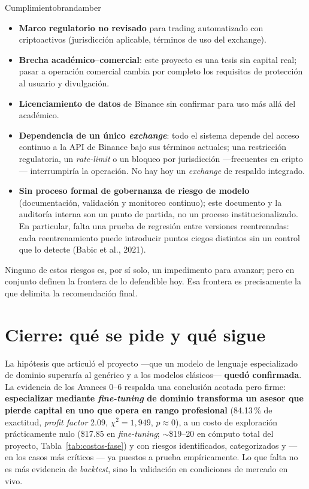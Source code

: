 \documentclass[11pt]{article}
\begin{document}
\begin{minipage}{0.485\linewidth}
\begin{riskpanel}{Cumplimiento}{brandamber}
\begin{itemize}
\item \textbf{Marco regulatorio no revisado} para trading automatizado con criptoactivos (jurisdicci\'on aplicable, t\'erminos de uso del exchange).
\item \textbf{Brecha acad\'emico--comercial}: este proyecto es una tesis sin capital real; pasar a operaci\'on comercial cambia por completo los requisitos de protecci\'on al usuario y divulgaci\'on.
\item \textbf{Licenciamiento de datos} de Binance sin confirmar para uso m\'as all\'a del acad\'emico.
\item \textbf{Dependencia de un \'unico \textit{exchange}}: todo el sistema depende del acceso continuo a la API de Binance bajo sus t\'erminos actuales; una restricci\'on regulatoria, un \textit{rate-limit} o un bloqueo por jurisdicci\'on ---frecuentes en cripto--- interrumpir\'ia la operaci\'on. No hay hoy un \textit{exchange} de respaldo integrado.
\item \textbf{Sin proceso formal de gobernanza de riesgo de modelo} (documentaci\'on, validaci\'on y monitoreo continuo); este documento y la auditor\'ia interna son un punto de partida, no un proceso institucionalizado. En particular, falta una prueba de regresi\'on entre versiones reentrenadas: cada reentrenamiento puede introducir puntos ciegos distintos sin un control que lo detecte (Babic et al., 2021).
\end{itemize}
\end{riskpanel}
\end{minipage}

\vspace{0.6em}
\noindent Ninguno de estos riesgos es, por s\'i solo, un impedimento para avanzar; pero en conjunto definen la frontera de lo defendible hoy. Esa frontera es precisamente la que delimita la recomendaci\'on final.

\section{Cierre: qu\'e se pide y qu\'e sigue}

La hip\'otesis que articul\'o el proyecto ---que un modelo de lenguaje especializado de dominio superar\'ia al gen\'erico y a los modelos cl\'asicos--- \textbf{qued\'o confirmada}. La evidencia de los Avances 0--6 respalda una conclusi\'on acotada pero firme: \textbf{especializar mediante \textit{fine-tuning} de dominio transforma un asesor que pierde capital en uno que opera en rango profesional} (84.13\,\% de exactitud, \textit{profit factor} 2.09, $\chi^2=1{,}949$, $p\approx0$), a un costo de exploraci\'on pr\'acticamente nulo (\$17.85 en \textit{fine-tuning}; $\sim$\$19--20 en c\'omputo total del proyecto, Tabla~\ref{tab:costos-fase}) y con riesgos identificados, categorizados y --- en los casos m\'as cr\'iticos --- ya puestos a prueba emp\'iricamente. Lo que falta no es m\'as evidencia de \textit{backtest}, sino la validaci\'on en condiciones de mercado en vivo.
\end{document}
